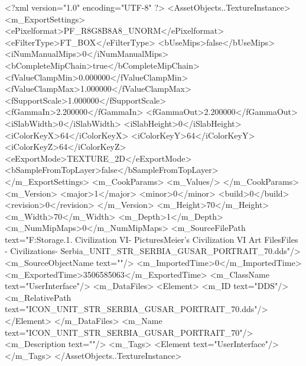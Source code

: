 <?xml version="1.0" encoding="UTF-8" ?>
<AssetObjects..TextureInstance>
	<m_ExportSettings>
		<ePixelformat>PF_R8G8B8A8_UNORM</ePixelformat>
		<eFilterType>FT_BOX</eFilterType>
		<bUseMips>false</bUseMips>
		<iNumManualMips>0</iNumManualMips>
		<bCompleteMipChain>true</bCompleteMipChain>
		<fValueClampMin>0.000000</fValueClampMin>
		<fValueClampMax>1.000000</fValueClampMax>
		<fSupportScale>1.000000</fSupportScale>
		<fGammaIn>2.200000</fGammaIn>
		<fGammaOut>2.200000</fGammaOut>
		<iSlabWidth>0</iSlabWidth>
		<iSlabHeight>0</iSlabHeight>
		<iColorKeyX>64</iColorKeyX>
		<iColorKeyY>64</iColorKeyY>
		<iColorKeyZ>64</iColorKeyZ>
		<eExportMode>TEXTURE_2D</eExportMode>
		<bSampleFromTopLayer>false</bSampleFromTopLayer>
	</m_ExportSettings>
	<m_CookParams>
		<m_Values/>
	</m_CookParams>
	<m_Version>
		<major>1</major>
		<minor>0</minor>
		<build>0</build>
		<revision>0</revision>
	</m_Version>
	<m_Height>70</m_Height>
	<m_Width>70</m_Width>
	<m_Depth>1</m_Depth>
	<m_NumMipMaps>0</m_NumMipMaps>
	<m_SourceFilePath text="F:\Mod Storage\2.1. Civilization VI\Mods\Archive - Pictures\Sid Meier's Civilization VI Art Files\Art Files - Civilizations\Civilization - Serbia\ICON_UNIT_STR_SERBIA_GUSAR_PORTRAIT_70.dds"/>
	<m_SourceObjectName text=""/>
	<m_ImportedTime>0</m_ImportedTime>
	<m_ExportedTime>3506585063</m_ExportedTime>
	<m_ClassName text="UserInterface"/>
	<m_DataFiles>
		<Element>
			<m_ID text="DDS"/>
			<m_RelativePath text="ICON_UNIT_STR_SERBIA_GUSAR_PORTRAIT_70.dds"/>
		</Element>
	</m_DataFiles>
	<m_Name text="ICON_UNIT_STR_SERBIA_GUSAR_PORTRAIT_70"/>
	<m_Description text=""/>
	<m_Tags>
		<Element text="UserInterface"/>
	</m_Tags>
</AssetObjects..TextureInstance>

